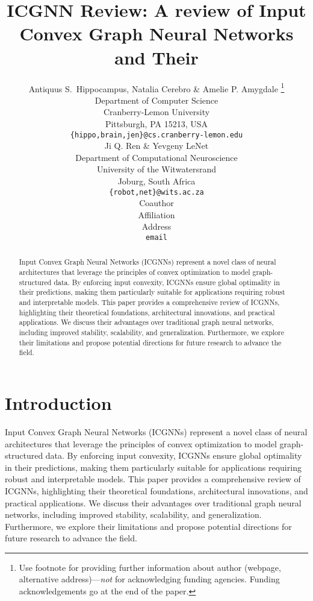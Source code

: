 \documentclass{article} %
\title{ICGNN Review: A review of Input Convex Graph Neural Networks and Their}
\author{Antiquus S.~Hippocampus, Natalia Cerebro \& Amelie P. Amygdale \thanks{ Use footnote for providing further information
about author (webpage, alternative address)---\emph{not} for acknowledging
funding agencies.  Funding acknowledgements go at the end of the paper.} \\
Department of Computer Science\\
Cranberry-Lemon University\\
Pittsburgh, PA 15213, USA \\
\texttt{\{hippo,brain,jen\}@cs.cranberry-lemon.edu} \\
\And
Ji Q. Ren \& Yevgeny LeNet \\
Department of Computational Neuroscience \\
University of the Witwatersrand \\
Joburg, South Africa \\
\texttt{\{robot,net\}@wits.ac.za} \\
\AND
Coauthor \\
Affiliation \\
Address \\
\texttt{email}
}
\begin{document}
\maketitle

\begin{abstract}
Input Convex Graph Neural Networks (ICGNNs) represent a novel class of neural architectures that leverage the principles of convex optimization to model graph-structured data. By enforcing input convexity, ICGNNs ensure global optimality in their predictions, making them particularly suitable for applications requiring robust and interpretable models. This paper provides a comprehensive review of ICGNNs, highlighting their theoretical foundations, architectural innovations, and practical applications. We discuss their advantages over traditional graph neural networks, including improved stability, scalability, and generalization. Furthermore, we explore their limitations and propose potential directions for future research to advance the field.
\end{abstract}
\section{Introduction}
Input Convex Graph Neural Networks (ICGNNs) represent a novel class of neural architectures that leverage the principles of convex optimization to model graph-structured data. By enforcing input convexity, ICGNNs ensure global optimality in their predictions, making them particularly suitable for applications requiring robust and interpretable models. This paper provides a comprehensive review of ICGNNs, highlighting their theoretical foundations, architectural innovations, and practical applications. We discuss their advantages over traditional graph neural networks, including improved stability, scalability, and generalization. Furthermore, we explore their limitations and propose potential directions for future research to advance the field.
\end{document}
